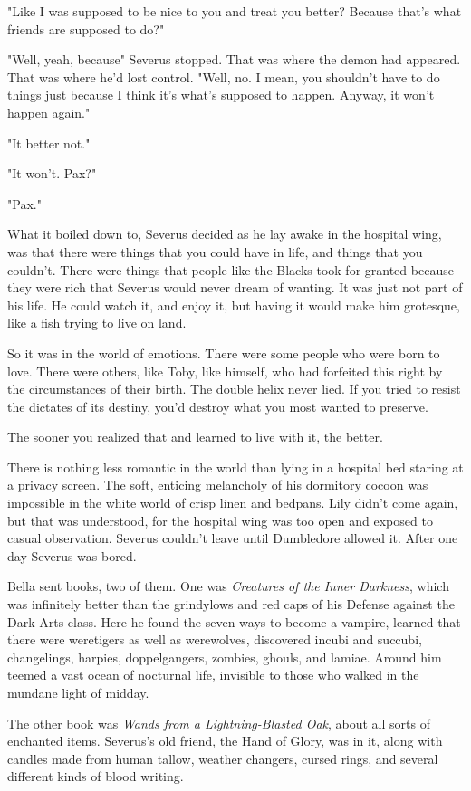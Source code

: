 "Like I was supposed to be nice to you and treat you better? Because that's what friends are supposed to do?"

"Well, yeah, because{\el}" Severus stopped. That was where the demon had appeared. That was where he'd lost control. "Well, no. I mean, you shouldn't have to do things just because I think it's what's supposed to happen. Anyway, it won't happen again."

"It better not."

"It won't. Pax?"

"Pax."

What it boiled down to, Severus decided as he lay awake in the hospital wing, was that there were things that you could have in life, and things that you couldn't. There were things that people like the Blacks took for granted because they were rich that Severus would never dream of wanting. It was just not part of his life. He could watch it, and enjoy it, but having it would make him grotesque, like a fish trying to live on land.

So it was in the world of emotions. There were some people who were born to love. There were others, like Toby, like himself, who had forfeited this right by the circumstances of their birth. The double helix never lied. If you tried to resist the dictates of its destiny, you'd destroy what you most wanted to preserve.

The sooner you realized that and learned to live with it, the better.

There is nothing less romantic in the world than lying in a hospital bed staring at a privacy screen. The soft, enticing melancholy of his dormitory cocoon was impossible in the white world of crisp linen and bedpans. Lily didn't come again, but that was understood, for the hospital wing was too open and exposed to casual observation. Severus couldn't leave until Dumbledore allowed it. After one day Severus was bored.

Bella sent books, two of them. One was \emph{Creatures of the Inner Darkness}, which was infinitely better than the grindylows and red caps of his Defense against the Dark Arts class. Here he found the seven ways to become a vampire, learned that there were weretigers as well as werewolves, discovered incubi and succubi, changelings, harpies, doppelgangers, zombies, ghouls, and lamiae. Around him teemed a vast ocean of nocturnal life, invisible to those who walked in the mundane light of midday.

The other book was \emph{Wands from a Lightning-Blasted Oak}, about all sorts of enchanted items. Severus's old friend, the Hand of Glory, was in it, along with candles made from human tallow, weather changers, cursed rings, and several different kinds of blood writing.

